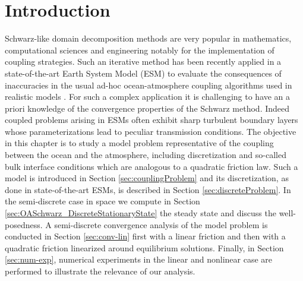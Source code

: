 \section{Introduction}
\label{sec:OASchwarz_Intro}
\par
Schwarz-like domain decomposition methods are very popular in 
mathematics, computational sciences and engineering notably for 
the implementation of coupling strategies. Such an iterative method
has been recently applied in a state-of-the-art Earth 
System Model (ESM) to evaluate the consequences of inaccuracies 
in the usual ad-hoc ocean-atmosphere coupling algorithms 
used in realistic models \cite{marti_schwarz_2021}. For such 
a complex application it is challenging to have an a priori 
knowledge of the convergence properties of the Schwarz method. 
Indeed coupled problems arising in ESMs often 
exhibit sharp turbulent boundary layers whose parameterizations 
lead to peculiar transmission conditions. The objective in
this chapter is to study a model problem representative 
of the coupling between the ocean and the atmosphere, including discretization 
and so-called bulk interface conditions which are analogous to a 
quadratic friction law. Such a model is introduced in Section \ref{sec:couplingProblem}
and its discretization, as done in state-of-the-art ESMs, 
is described in Section \ref{sec:discreteProblem}.
In the semi-discrete case in space we compute in Section
\ref{sec:OASchwarz_DiscreteStationaryState} the steady state
and discuss the well-posedness.
A semi-discrete convergence analysis of the model problem is conducted
in Section \ref{sec:conv-lin} first with a linear friction and then
with a quadratic friction linearized around equilibrium solutions. 
Finally, in Section \ref{sec:num-exp}, numerical experiments in the 
linear and nonlinear case are performed to illustrate the relevance 
of our analysis. \par
%
